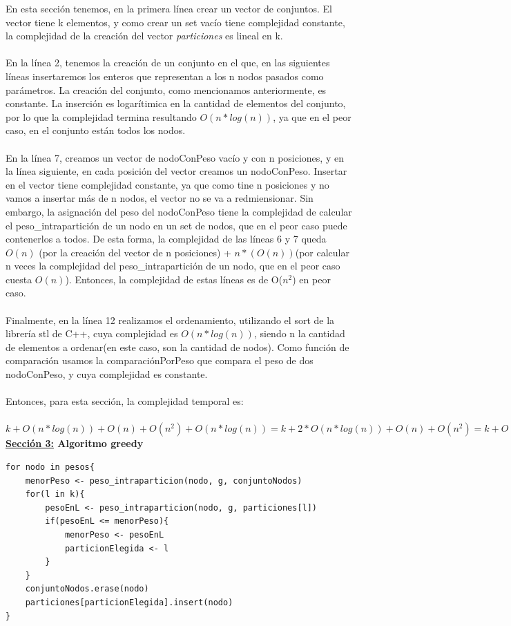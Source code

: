 \documentclass[10pt,a4paper]{article}
\begin{document}
En esta sección tenemos, en la primera línea crear un vector de conjuntos. El vector tiene k elementos, y como crear un set vacío tiene complejidad constante, la complejidad de la creación del vector \textit{particiones} es lineal en k.\\\\
En la línea 2, tenemos la creación de un conjunto en el que, en las siguientes líneas insertaremos los enteros que representan a los n nodos pasados como parámetros. La creación del conjunto, como mencionamos anteriormente, es constante. La inserción es logarítimica en la cantidad de elementos del conjunto, por lo que la complejidad termina resultando $O(n*log (n))$, ya que en el peor caso, en el conjunto están todos los nodos.\\\\
En la línea 7, creamos un vector de nodoConPeso vacío y con n posiciones, y en la línea siguiente, en cada posición del vector creamos un nodoConPeso. Insertar en el vector tiene complejidad constante, ya que como tine n posiciones y no vamos a insertar más de n nodos, el vector no se va a redmiensionar. Sin embargo, la asignación del peso del nodoConPeso tiene la complejidad de calcular el peso\_intrapartición de un nodo en un set de nodos, que en el peor caso puede contenerlos a todos. De esta forma, la complejidad de las líneas 6 y 7 queda $O(n)$ (por la creación del vector de n posiciones) + $n*(O(n))$(por calcular n veces la complejidad del peso\_intrapartición de un nodo, que en el peor caso cuesta $O(n)$). Entonces, la complejidad de estas líneas es de O($n^2$) en peor caso.\\\\
Finalmente, en la línea 12 realizamos el ordenamiento, utilizando el sort de la librería stl de C++, cuya complejidad es $O(n*log (n))$, siendo n la cantidad de elementos a ordenar(en este caso, son la cantidad de nodos). Como función de comparación usamos la comparaciónPorPeso que compara el peso de dos nodoConPeso, y cuya complejidad es constante.\\\\
Entonces, para esta sección, la complejidad temporal es:\\\\
$k + O(n*log(n))+O(n)+ O(n^2)+O(n*log(n)) = k + 2*O(n*log(n)) + O(n) + O(n^2) = k +  O(n^2)$\\

\textbf{\underline{Sección 3:} Algoritmo greedy}

\begin{lstlisting}[mathescape]
for nodo in pesos{
	menorPeso <- peso_intraparticion(nodo, g, conjuntoNodos)
	for(l in k){
		pesoEnL <- peso_intraparticion(nodo, g, particiones[l])
		if(pesoEnL <= menorPeso){
			menorPeso <- pesoEnL
			particionElegida <- l
		}
	}
	conjuntoNodos.erase(nodo)
	particiones[particionElegida].insert(nodo)
}
\end{lstlisting}
\end{document}
